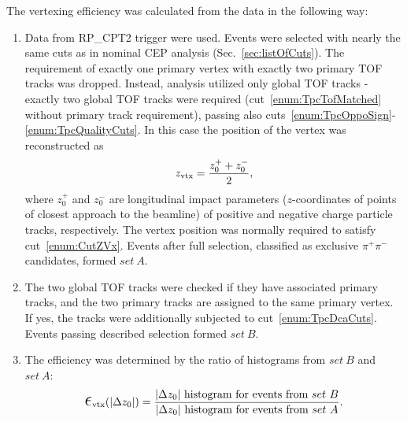 The vertexing efficiency was calculated from the data in the following way:
\begin{enumerate}
\item Data from RP\_CPT2 trigger were used. Events were selected with nearly the same cuts as in nominal CEP analysis (Sec.~\ref{sec:listOfCuts}). The requirement of exactly one primary vertex with exactly two primary TOF tracks was dropped. Instead, analysis utilized only global TOF tracks - exactly two global TOF tracks were required (cut~\ref{enum:TpcTofMatched} without primary track requirement), passing also cuts~\ref{enum:TpcOppoSign}-\ref{enum:TpcQualityCuts}. In this case the position of the vertex was reconstructed as\vspace*{-10pt}
\begin{equation}
 z_{\text{vtx}} = \frac{z_{0}^{+}+z_{0}^{-}}{2},\vspace*{-5pt}
\end{equation}
where $z_{0}^{+}$ and $z_{0}^{-}$ are longitudinal impact parameters ($z$-coordinates of points of closest approach to the beamline) of positive and negative charge particle tracks, respectively. The vertex position was normally required to satisfy cut~\ref{enum:CutZVx}. Events after full selection, classified as exclusive $\pi^{+}\pi^{-}$ candidates, formed $set~A$.

\item The two global TOF tracks were checked if they have associated primary tracks, and the two primary tracks are assigned to the same primary vertex. If yes, the tracks were additionally subjected to cut~\ref{enum:TpcDcaCuts}. Events passing described selection formed $set~B$.

	\item The efficiency was determined by the ratio of histograms from $set~B$ and $set~A$:
	\begin{equation}\label{eq:vertexingEffDef}
 \mbox{\LARGE$\epsilon$}_{\text{vtx}}(|\Delta z_{0}|) = \frac{|\Delta z_{0}|~\text{histogram for events from}~set~B}{|\Delta z_{0}|~\text{histogram for events from}~set~A}.
  \end{equation}
\end{enumerate}

